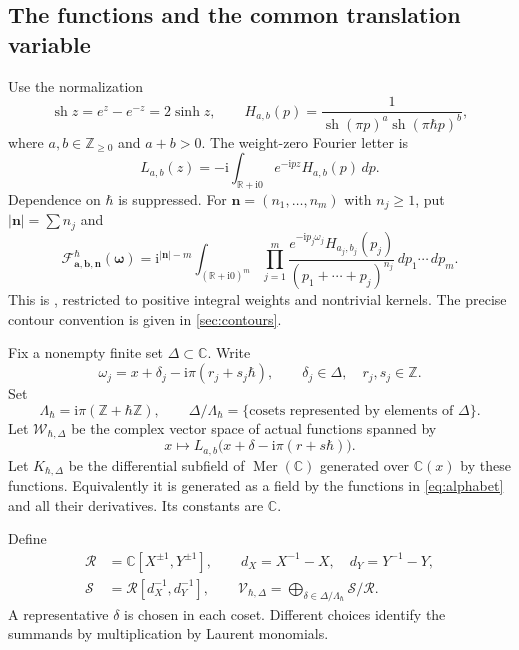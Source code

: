 \documentclass[11pt]{article}
\numberwithin{equation}{section}
\theoremstyle{definition}
\theoremstyle{remark}
\newcommand{\C}{\mathbb C}
\newcommand{\Z}{\mathbb Z}
\newcommand{\R}{\mathbb R}
\newcommand{\N}{\mathbb Z_{\geq0}}
\newcommand{\dd}{\,d}
\newcommand{\ii}{\mathrm i}
\newcommand{\sh}{\operatorname{sh}}
\newcommand{\Mer}{\operatorname{Mer}}
\newcommand{\calF}{\mathcal F}
\newcommand{\calR}{\mathcal R}
\newcommand{\calS}{\mathcal S}
\newcommand{\calW}{\mathcal W}
\newcommand{\calV}{\mathcal V}
\newcommand{\qh}{\hbar}
\begin{document}
\subsection{The functions and the common translation variable}

Use the normalization
\[
 \sh z=e^z-e^{-z}=2\sinh z,
 \qquad
 H_{a,b}(p)=\frac1{\sh(\pi p)^a\sh(\pi\qh p)^b},
\]
where $a,b\in\N$ and $a+b>0$. The weight-zero Fourier letter is
\begin{equation}\label{eq:L-intro}
 L_{a,b}(z)=-\ii\int_{\R+\ii0}e^{-\ii pz}H_{a,b}(p)\dd p.
\end{equation}
Dependence on $\qh$ is suppressed. For $\mathbf n=(n_1,\ldots,n_m)$ with
$n_j\geq1$, put $|\mathbf n|=\sum n_j$ and
\begin{equation}\label{eq:F-intro}
 \calF_{\mathbf a,\mathbf b,\mathbf n}^{\qh}(\boldsymbol\omega)
 =\ii^{|\mathbf n|-m}
 \int_{(\R+\ii0)^m}
 \prod_{j=1}^m
 \frac{e^{-\ii p_j\omega_j}H_{a_j,b_j}(p_j)}
 {(p_1+\cdots+p_j)^{n_j}}
 \dd p_1\cdots\dd p_m .
\end{equation}
This is \cite[Definition~1.2]{Goncharov2026}, restricted to positive integral
weights and nontrivial kernels. The precise contour convention is given in
\cref{sec:contours}.

Fix a nonempty finite set $\Delta\subset\C$. Write
\begin{equation}\label{eq:translation}
 \omega_j=x+\delta_j-\ii\pi(r_j+s_j\qh),
 \qquad \delta_j\in\Delta,\quad r_j,s_j\in\Z.
\end{equation}
Set
\[
 \Lambda_{\qh}=\ii\pi(\Z+\qh\Z),\qquad
 \Delta/\Lambda_{\qh}
 =\{\text{cosets represented by elements of }\Delta\}.
\]
Let $\calW_{\qh,\Delta}$ be the complex vector space of actual functions spanned by
\begin{equation}\label{eq:alphabet}
 x\longmapsto L_{a,b}\bigl(x+\delta-\ii\pi(r+s\qh)\bigr).
\end{equation}
Let $K_{\qh,\Delta}$ be the differential subfield of $\Mer(\C)$ generated over
$\C(x)$ by these functions. Equivalently it is generated as a field by the
functions in \eqref{eq:alphabet} and all their derivatives. Its constants are
$\C$.

Define
\begin{equation}\label{eq:spectral-intro}
 \begin{split}
 \calR&=\C[X^{\pm1},Y^{\pm1}],\qquad
 d_X=X^{-1}-X,\quad d_Y=Y^{-1}-Y,\\
 \calS&=\calR[d_X^{-1},d_Y^{-1}],\qquad
 \calV_{\qh,\Delta}=\bigoplus_{\delta\in\Delta/\Lambda_{\qh}}\calS/\calR.
 \end{split}
\end{equation}
A representative $\delta$ is chosen in each coset. Different choices identify
the summands by multiplication by Laurent monomials.
\end{document}
